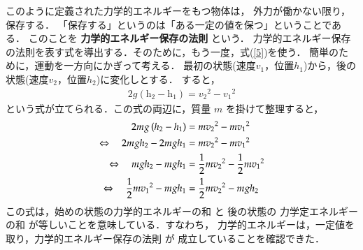                 このように定義された力学的エネルギーをもつ物体は，
                外力が働かない限り，
                保存する．
                「保存する」というのは「ある一定の値を保つ」ということである．
                このことを \textbf{力学的エネルギー保存の法則} という．
                力学的エネルギー保存の法則を表す式を導出する．そのために，もう一度，式(\ref{5})を使う．
                簡単のために，運動を一方向にかぎって考える．
                最初の状態(速度$v_{1}$，位置$h_{1}$)から，後の状態(速度$v_{2}$，位置$h_{2}$)に変化しとする．
                すると，
                    \begin{align}
                        2\textit{g}\left(\textit{h}_{2}-\textit{h}_{1}\right)
                        ={\textit{v}_{2}}^{2}-{\textit{v}_{1}}^{2}
                    \end{align}
                という式が立てられる．この式の両辺に，質量 $m$ を掛けて整理すると，
                    \begin{align}
                        2mg\left(\textit{h}_{2}-\textit{h}_{1}\right)
                        &= m{\textit{v}_{2}}^{2}-m{\textit{v}_{1}}^{2} \notag \\
                        \Leftrightarrow\quad 2mgh_{2}-2mgh_{1}
                        &= m{\textit{v}_{2}}^{2}-m{\textit{v}_{1}}^{2} \notag \\
                        \Leftrightarrow\quad mgh_{2}-mgh_{1}
                        &= \frac{1}{2}m{\textit{v}_{2}}^{2}-\frac{1}{2}m{\textit{v}_{1}}^{2} \notag \\
                        \Leftrightarrow\quad \frac{1}{2}m{\textit{v}_{1}}^{2}-mgh_{1}
                        &= \frac{1}{2}m{\textit{v}_{2}}^{2} -mgh_{2}
                    \end{align}
                この式は，始めの状態の力学的エネルギーの和 と 後の状態の
                力学定エネルギーの和 が等しいことを意味している．すなわち，
                力学的エネルギーは，一定値を取り，力学的エネルギー保存の法則 が
                成立していることを確認できた．

